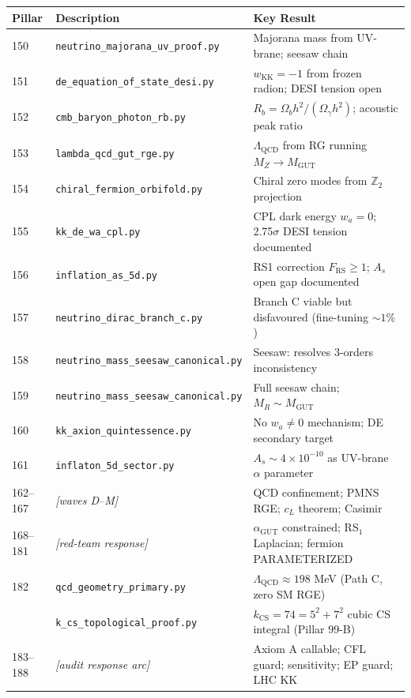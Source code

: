 \documentclass[12pt,a4paper]{article}
\begin{document}
\begin{center}
\small
\begin{tabular}{lll}
\hline
Pillar & Description & Key Result \\
\hline
150 & \texttt{neutrino\_majorana\_uv\_proof.py} & Majorana mass from UV-brane; seesaw chain \\
151 & \texttt{de\_equation\_of\_state\_desi.py} & $w_\mathrm{KK} = -1$ from frozen radion; DESI tension open \\
152 & \texttt{cmb\_baryon\_photon\_rb.py} & $R_b = \Omega_b h^2 / (\Omega_\gamma h^2)$; acoustic peak ratio \\
153 & \texttt{lambda\_qcd\_gut\_rge.py} & $\Lambda_\mathrm{QCD}$ from RG running $M_Z \to M_\mathrm{GUT}$ \\
154 & \texttt{chiral\_fermion\_orbifold.py} & Chiral zero modes from $\mathbb{Z}_2$ projection \\
155 & \texttt{kk\_de\_wa\_cpl.py} & CPL dark energy $w_a = 0$; 2.75$\sigma$ DESI tension documented \\
156 & \texttt{inflation\_as\_5d.py} & RS1 correction $F_\mathrm{RS} \geq 1$; $A_s$ open gap documented \\
157 & \texttt{neutrino\_dirac\_branch\_c.py} & Branch C viable but disfavoured (fine-tuning $\sim 1\%$) \\
158 & \texttt{neutrino\_mass\_seesaw\_canonical.py} & Seesaw: resolves 3-orders inconsistency \\
159 & \texttt{neutrino\_mass\_seesaw\_canonical.py} & Full seesaw chain; $M_R \sim M_\mathrm{GUT}$ \\
160 & \texttt{kk\_axion\_quintessence.py} & No $w_a \neq 0$ mechanism; DE secondary target \\
161 & \texttt{inflaton\_5d\_sector.py} & $A_s \sim 4\times10^{-10}$ as UV-brane $\alpha$ parameter \\
162--167 & \emph{[waves D--M]} & QCD confinement; PMNS RGE; $c_L$ theorem; Casimir \\
168--181 & \emph{[red-team response]} & $\alpha_\mathrm{GUT}$ constrained; RS$_1$ Laplacian; fermion PARAMETERIZED \\
182 & \texttt{qcd\_geometry\_primary.py} & $\Lambda_\mathrm{QCD} \approx 198$ MeV (Path C, zero SM RGE) \\
      & \texttt{k\_cs\_topological\_proof.py} & $k_\mathrm{CS} = 74 = 5^2+7^2$ cubic CS integral (Pillar 99-B) \\
183--188 & \emph{[audit response arc]} & Axiom A callable; CFL guard; sensitivity; EP guard; LHC KK \\

\end{tabular}
\end{center}
\end{document}
